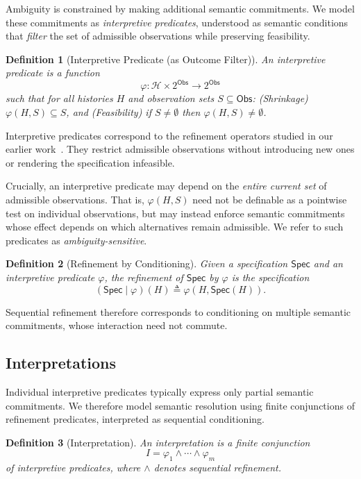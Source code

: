 \documentclass[acmsmall,nonacm]{acmart}
\newtheorem{definition}{Definition}
\theoremstyle{remark}
\numberwithin{definition}{section}
\numberwithin{theorem}{section}
\numberwithin{lemma}{section}
\numberwithin{corollary}{section}
\numberwithin{remark}{section}
\numberwithin{example}{section}
\numberwithin{observation}{section}
\numberwithin{assumption}{section}
\newcommand{\Hist}{\mathcal{H}}
\newcommand{\Obs}{\mathsf{Obs}}
\newcommand{\Spec}{\mathsf{Spec}}
\begin{document}
Ambiguity is constrained by making additional semantic commitments.
We model these commitments as \emph{interpretive predicates}, understood as
semantic conditions that \emph{filter} the set of admissible observations while
preserving feasibility.

\begin{definition}[Interpretive Predicate (as Outcome Filter)]
An \emph{interpretive predicate} is a function
\[
  \varphi : \Hist \times 2^{\Obs} \to 2^{\Obs}
\]
such that for all histories $H$ and observation sets $S \subseteq \Obs$:
(\emph{Shrinkage}) $\varphi(H,S) \subseteq S$, and
(\emph{Feasibility}) if $S \neq \emptyset$ then $\varphi(H,S) \neq \emptyset$.
\end{definition}

Interpretive predicates correspond to the refinement operators studied in our
earlier work~\cite{hellerstein2026interpretation}.
They restrict admissible observations without introducing new ones or rendering
the specification infeasible.

Crucially, an interpretive predicate may depend on the \emph{entire current set}
of admissible observations.
That is, $\varphi(H,S)$ need not be definable as a pointwise test on individual
observations, but may instead enforce semantic commitments whose effect depends
on which alternatives remain admissible.
We refer to such predicates as \emph{ambiguity-sensitive}.

\begin{definition}[Refinement by Conditioning]
Given a specification $\Spec$ and an interpretive predicate $\varphi$, the
\emph{refinement} of $\Spec$ by $\varphi$ is the specification
\[
  (\Spec \mid \varphi)(H) \triangleq \varphi(H,\Spec(H)).
\]
\end{definition}

Sequential refinement therefore corresponds to conditioning on multiple semantic
commitments, whose interaction need not commute.

\subsection{Interpretations}

Individual interpretive predicates typically express only partial semantic
commitments.
We therefore model semantic resolution using finite conjunctions of refinement
predicates, interpreted as sequential conditioning.

\begin{definition}[Interpretation]
An \emph{interpretation} is a finite conjunction
\[
  I = \varphi_1 \wedge \cdots \wedge \varphi_m
\]
of interpretive predicates, where $\wedge$ denotes sequential refinement.
\end{definition}
\end{document}
